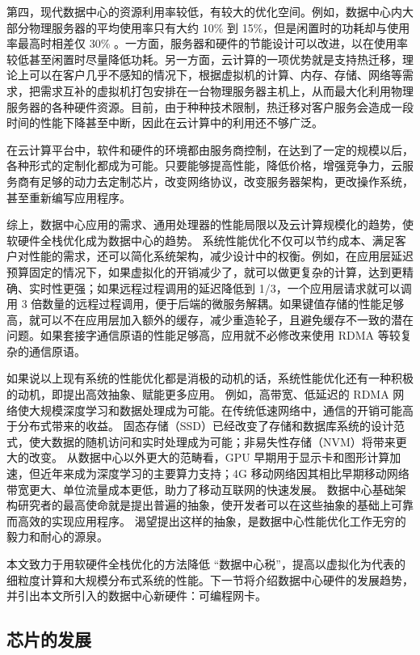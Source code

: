 第四，现代数据中心的资源利用率较低，有较大的优化空间。例如，数据中心内大部分物理服务器的平均使用率只有大约 10\% 到 15\%，但是闲置时的功耗却与使用率最高时相差仅 30\% \cite{barroso2018datacenter}。一方面，服务器和硬件的节能设计可以改进，以在使用率较低甚至闲置时尽量降低功耗。另一方面，云计算的一项优势就是支持热迁移，理论上可以在客户几乎不感知的情况下，根据虚拟机的计算、内存、存储、网络等需求，把需求互补的虚拟机打包安排在一台物理服务器主机上，从而最大化利用物理服务器的各种硬件资源。目前，由于种种技术限制，热迁移对客户服务会造成一段时间的性能下降甚至中断，因此在云计算中的利用还不够广泛。

在云计算平台中，软件和硬件的环境都由服务商控制，在达到了一定的规模以后，各种形式的定制化都成为可能。只要能够提高性能，降低价格，增强竞争力，云服务商有足够的动力去定制芯片，改变网络协议，改变服务器架构，更改操作系统，甚至重新编写应用程序。

综上，数据中心应用的需求、通用处理器的性能局限以及云计算规模化的趋势，使软硬件全栈优化成为数据中心的趋势。
系统性能优化不仅可以节约成本、满足客户对性能的需求，还可以简化系统架构，减少设计中的权衡。例如，在应用层延迟预算固定的情况下，如果虚拟化的开销减少了，就可以做更复杂的计算，达到更精确、实时性更强；如果远程过程调用的延迟降低到 1/3，一个应用层请求就可以调用 3 倍数量的远程过程调用，便于后端的微服务解耦。如果键值存储的性能足够高，就可以不在应用层加入额外的缓存，减少重造轮子，且避免缓存不一致的潜在问题。如果套接字通信原语的性能足够高，应用就不必修改来使用 RDMA 等较复杂的通信原语。

如果说以上现有系统的性能优化都是消极的动机的话，系统性能优化还有一种积极的动机，即提出高效抽象、赋能更多应用。
例如，高带宽、低延迟的 RDMA 网络使大规模深度学习和数据处理成为可能。在传统低速网络中，通信的开销可能高于分布式带来的收益。
固态存储（SSD）已经改变了存储和数据库系统的设计范式，使大数据的随机访问和实时处理成为可能；非易失性存储（NVM）将带来更大的改变。
从数据中心以外更大的范畴看，GPU 早期用于显示卡和图形计算加速，但近年来成为深度学习的主要算力支持；4G 移动网络因其相比早期移动网络带宽更大、单位流量成本更低，助力了移动互联网的快速发展。
数据中心基础架构研究者的最高使命就是提出普遍的抽象，使开发者可以在这些抽象的基础上可靠而高效的实现应用程序。
渴望提出这样的抽象，是数据中心性能优化工作无穷的毅力和耐心的源泉。

本文致力于用软硬件全栈优化的方法降低 ``数据中心税''，提高以虚拟化为代表的细粒度计算和大规模分布式系统的性能。下一节将介绍数据中心硬件的发展趋势，并引出本文所引入的数据中心新硬件：可编程网卡。
\fi

\iffalse

\subsection{芯片的发展}

